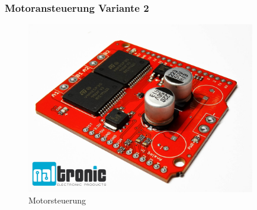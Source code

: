 \subsubsection{Motoransteuerung Variante 2}
\begin{figure}[H] 
\begin{center}

\includegraphics[width=10cm]{Bilder/Bauteile/Motorsteuerung}
\caption{Motorsteuerung}
\label{Motoransteuerung}

\end{center}
\end{figure}
